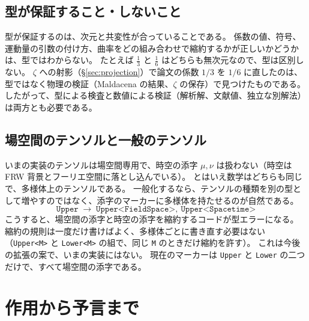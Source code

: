 \documentclass[a4paper,11pt]{ltjsarticle}
\newcommand{\code}[1]{\texttt{#1}}
\begin{document}
\subsection{型が保証すること・しないこと}

型が保証するのは、次元と共変性が合っていることである。
係数の値、符号、運動量の引数の付け方、曲率をどの組み合わせで縮約するかが正しいかどうかは、型ではわからない。
たとえば $\tfrac13$ と $\tfrac16$ はどちらも無次元なので、型は区別しない。
$\zeta$ への射影（\S\ref{sec:projection}）で論文の係数 $1/3$ を $1/6$ に直したのは、型ではなく物理の検証（Maldacena の結果\cite{Maldacena2003}、$\zeta$ の保存）で見つけたものである。
したがって、型による検査と数値による検証（解析解、文献値、独立な別解法）は両方とも必要である。

\subsection{場空間のテンソルと一般のテンソル}

いまの実装のテンソルは場空間専用で、時空の添字 $\mu,\nu$ は扱わない（時空は FRW 背景とフーリエ空間に落とし込んでいる）。
とはいえ数学はどちらも同じで、多様体上のテンソルである。
一般化するなら、テンソルの種類を別の型として増やすのではなく、添字のマーカーに多様体を持たせるのが自然である。
\[
\code{Upper} \;\longrightarrow\; \code{Upper<FieldSpace>},\ \code{Upper<Spacetime>}
\]
こうすると、場空間の添字と時空の添字を縮約するコードが型エラーになる。
縮約の規則は一度だけ書けばよく、多様体ごとに書き直す必要はない（\code{Upper<M>} と \code{Lower<M>} の組で、同じ \code{M} のときだけ縮約を許す）。
これは今後の拡張の案で、いまの実装にはない。
現在のマーカーは \code{Upper} と \code{Lower} の二つだけで、すべて場空間の添字である。

\section{作用から予言まで}
\label{sec:pipeline}
\end{document}

